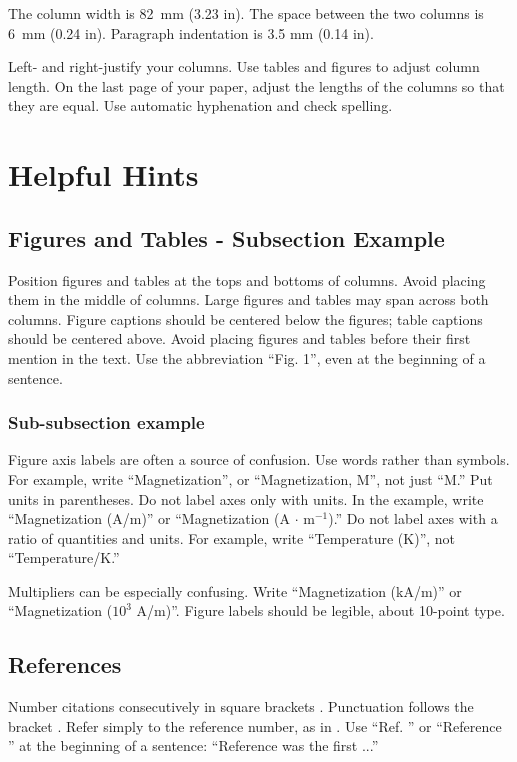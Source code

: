 The column width is 82~mm (3.23 in). The space between the two columns is
6~mm (0.24 in). Paragraph indentation is 3.5 mm (0.14 in).

Left- and right-justify your columns. Use tables and figures to
adjust column length. On the last page of your paper, adjust the
lengths of the columns so that they are equal. Use automatic
hyphenation and check spelling.


\section{Helpful Hints}

\subsection{Figures and Tables - Subsection Example}

Position figures and tables at the tops and bottoms of columns. Avoid
placing them in the middle of columns. Large figures and tables may span
across both columns. Figure captions should be centered below the figures;
table captions should be centered above. Avoid placing figures and tables
before their first mention in the text. Use the abbreviation ``Fig. 1'',
even at the beginning of a sentence.

\subsubsection{Sub-subsection example}
Figure axis labels are often a source of confusion. Use words rather than
symbols. For example, write ``Magnetization'', or ``Magnetization, M'',
not just ``M.''  Put units in parentheses. Do not label axes only with
units. In the example, write ``Magnetization (A/m)'' or ``Magnetization (A
$\cdot$ m$^{-1}$).'' Do not label axes with a ratio of quantities and
units. For example, write ``Temperature (K)'', not ``Temperature/K.''

Multipliers can be especially confusing. Write ``Magnetization (kA/m)'' or
``Magnetization ($10^{3}$ A/m)''. Figure labels should be legible, about
10-point type.


\subsection{References}

Number citations consecutively in square brackets \cite{eason}.
Punctuation follows the bracket \cite{maxwell}. Refer simply to the
reference number, as in \cite{jacobs}. Use ``Ref. \cite{jacobs}'' or
``Reference \cite{jacobs}'' at the beginning of a sentence: ``Reference
\cite{jacobs} was the first ...''

